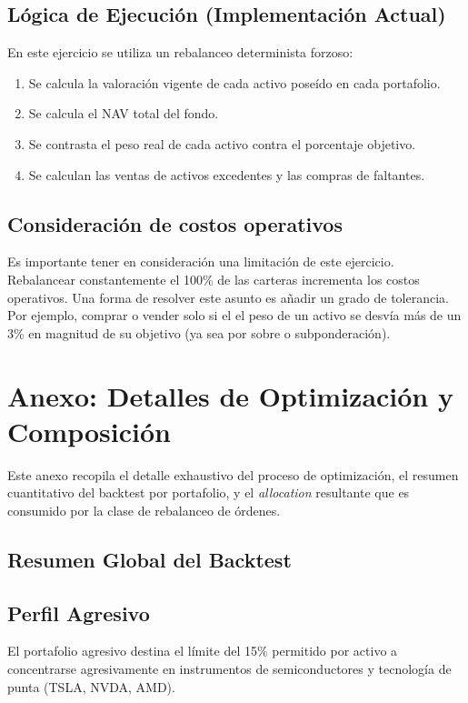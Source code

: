 \documentclass[11pt, a4paper]{article}
\begin{document}
\subsection{Lógica de Ejecución (Implementación Actual)}
En este ejercicio se utiliza un rebalanceo determinista forzoso: 
\begin{enumerate}
    \item Se calcula la valoración vigente de cada activo poseído en cada portafolio.
    \item Se calcula el NAV total del fondo.
    \item Se contrasta el peso real de cada activo contra el porcentaje objetivo.
    \item Se calculan las ventas de activos excedentes y las compras de faltantes.
\end{enumerate}

\subsection{Consideración de costos operativos}

Es importante tener en consideración una limitación de este ejercicio. Rebalancear constantemente el 100\% de las carteras incrementa los costos operativos. Una forma de resolver este asunto es añadir un grado de tolerancia. Por ejemplo, comprar o vender solo si el el peso de un activo se desvía más de un 3\% en magnitud de su objetivo (ya sea por sobre o subponderación).

\newpage

\section{Anexo: Detalles de Optimización y Composición}

Este anexo recopila el detalle exhaustivo del proceso de optimización, el resumen cuantitativo del backtest por portafolio, y el \textit{allocation} resultante que es consumido por la clase de rebalanceo de órdenes.

\subsection{Resumen Global del Backtest}


\subsection{Perfil Agresivo}
El portafolio agresivo destina el límite del 15\% permitido por activo a concentrarse agresivamente en instrumentos de semiconductores y tecnología de punta (TSLA, NVDA, AMD).
\end{document}
